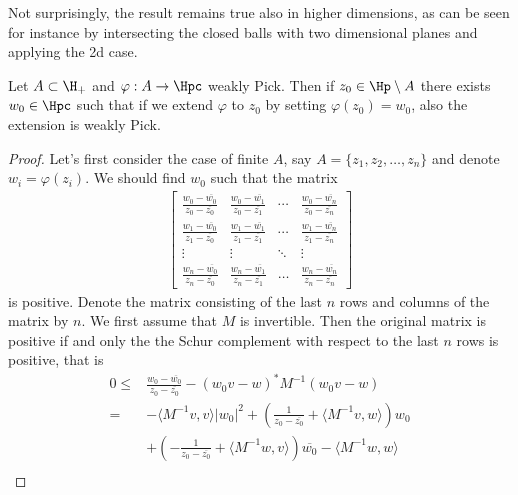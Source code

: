 Not surprisingly, the result remains true also in higher dimensions, as can be seen for instance by intersecting the closed balls with two dimensional planes and applying the 2d case.

\begin{lem}\label{pick_extension_lemma}
	Let $A \subset \H_{+}$ and $\varphi : A \to \Hpc$ weakly Pick. Then if $z_{0} \in \Hp \setminus A$ there exists $w_{0} \in \Hpc$ such that if we extend $\varphi$ to $z_{0}$ by setting $\varphi(z_{0}) = w_{0}$, also the extension is weakly Pick.
\end{lem}
\begin{proof}
	Let's first consider the case of finite $A$, say $A = \{z_{1}, z_{2}, \ldots, z_{n}\}$ and denote $w_{i} = \varphi(z_{i})$. We should find $w_{0}$ such that the matrix
	\begin{align*}
		\begin{bmatrix}
			\frac{w_{0} - \overline{w_{0}}}{z_{0} - \overline{z_{0}}} & \frac{w_{0} - \overline{w_{1}}}{z_{0} - \overline{z_{1}}} & \cdots & \frac{w_{0} - \overline{w_{n}}}{z_{0} - \overline{z_{n}}} \\
			\frac{w_{1} - \overline{w_{0}}}{z_{1} - \overline{z_{0}}} & \frac{w_{1} - \overline{w_{1}}}{z_{1} - \overline{z_{1}}} & \cdots & \frac{w_{1} - \overline{w_{n}}}{z_{1} - \overline{z_{n}}} \\
			\vdots & \vdots & \ddots & \vdots \\
			\frac{w_{n} - \overline{w_{0}}}{z_{n} - \overline{z_{0}}} & \frac{w_{n} - \overline{w_{1}}}{z_{n} - \overline{z_{1}}} & \ldots & \frac{w_{n} - \overline{w_{n}}}{z_{n} - \overline{z_{n}}}
		\end{bmatrix}
	\end{align*}
	is positive. Denote the matrix consisting of the last $n$ rows and columns of the matrix by $n$. We first assume that $M$ is invertible. Then the original matrix is positive if and only the the Schur complement with respect to the last $n$ rows is positive, that is
	\begin{align*}
		0 \leq &\frac{w_{0} - \overline{w_{0}}}{z_{0} - \overline{z_{0}}} - (w_{0} v - w)^{*} M^{-1} (w_{0} v - w) \\
		=& -\langle M^{-1} v, v \rangle |w_{0}|^2 + \left(\frac{1}{z_{0} - \overline{z_{0}}} + \langle M^{-1} v, w \rangle \right) w_{0} \\
		&+  \left(-\frac{1}{z_{0} - \overline{z_{0}}} + \langle M^{-1} w, v \rangle \right) \overline{w_{0}} - \langle M^{-1} w, w \rangle \\

\end{align*}
\end{proof}

